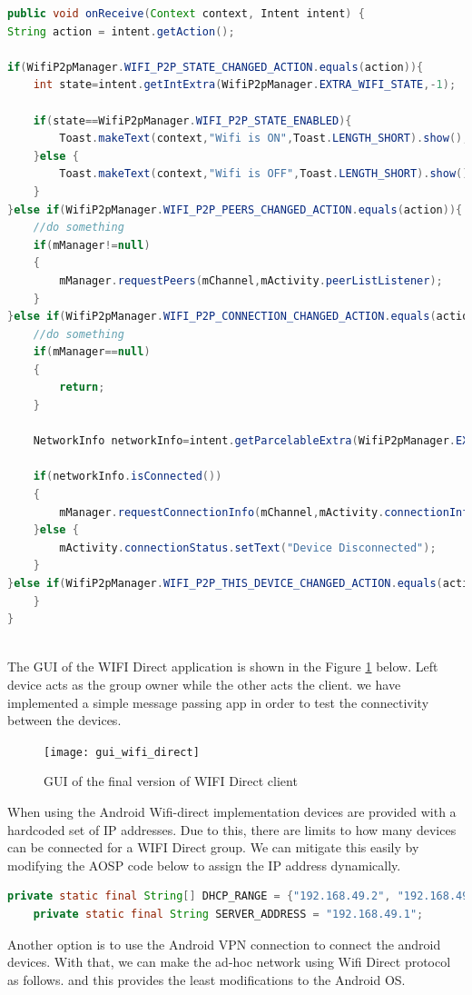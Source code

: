 \begin{lstlisting}[language=Java]
public void onReceive(Context context, Intent intent) {
String action = intent.getAction();

if(WifiP2pManager.WIFI_P2P_STATE_CHANGED_ACTION.equals(action)){
    int state=intent.getIntExtra(WifiP2pManager.EXTRA_WIFI_STATE,-1);

    if(state==WifiP2pManager.WIFI_P2P_STATE_ENABLED){
        Toast.makeText(context,"Wifi is ON",Toast.LENGTH_SHORT).show();
    }else {
        Toast.makeText(context,"Wifi is OFF",Toast.LENGTH_SHORT).show();
    }
}else if(WifiP2pManager.WIFI_P2P_PEERS_CHANGED_ACTION.equals(action)){
    //do something
    if(mManager!=null)
    {
        mManager.requestPeers(mChannel,mActivity.peerListListener);
    }
}else if(WifiP2pManager.WIFI_P2P_CONNECTION_CHANGED_ACTION.equals(action)){
    //do something
    if(mManager==null)
    {
        return;
    }

    NetworkInfo networkInfo=intent.getParcelableExtra(WifiP2pManager.EXTRA_NETWORK_INFO);

    if(networkInfo.isConnected())
    {
        mManager.requestConnectionInfo(mChannel,mActivity.connectionInfoListener);
    }else {
        mActivity.connectionStatus.setText("Device Disconnected");
    }
}else if(WifiP2pManager.WIFI_P2P_THIS_DEVICE_CHANGED_ACTION.equals(action)){
	} 	
}
	
\end{lstlisting}
The GUI of the WIFI Direct application is shown in the Figure \ref{fig:timeffline_34FSEFS_q1} below. Left device acts as the group owner while the other acts the client. we have implemented a simple message passing app in order to test the connectivity between the devices.
\begin{figure}[H]
    \centering
    \texttt{[image: gui\_wifi\_direct]}
    \caption{GUI of the final version of WIFI Direct client}
    \label{fig:timeffline_34FSEFS_q1}
\end{figure}
\vspace{12pt}

When using the Android Wifi-direct implementation devices are provided with a hardcoded set of IP addresses. Due to this, there are limits to how many devices can be connected for a WIFI Direct group. We can mitigate this easily by modifying the AOSP code below to assign the IP address dynamically.
\begin{lstlisting}[language=Java]
    private static final String[] DHCP_RANGE = {"192.168.49.2", "192.168.49.254"};
    private static final String SERVER_ADDRESS = "192.168.49.1";	
\end{lstlisting}
Another option is to use the Android VPN connection to connect the android devices. With that, we can make the ad-hoc network using Wifi Direct protocol as follows.
and this provides the least modifications to the Android OS.


